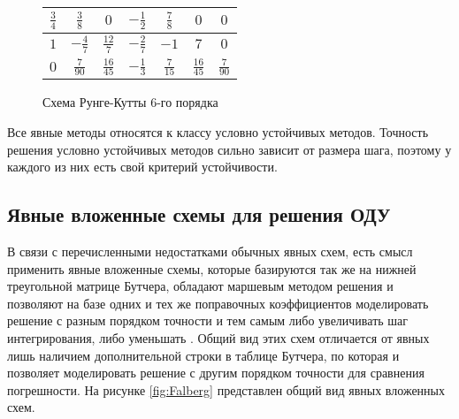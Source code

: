 \begin{figure}
\begin{minipage}[t]{7.5cm}
\begin{table}
\begin{tabular}{|c|c|c|c|c|c|c|}
            $\frac{3}{4}$ & $\frac{3}{8}$ & $0$ & $-\frac{1}{2}$ & $\frac{7}{8}$ & $0$ & $0$\\
            \hline
            $1$ & $-\frac{4}{7}$ & $\frac{12}{7}$ & $-\frac{2}{7}$ & $-1$ & $7$ & $0$\\
            \hline
            $0$ & \cellcolor{lightgray} $\frac{7}{90}$ & \cellcolor{lightgray} $\frac{16}{45}$ & \cellcolor{lightgray} $-\frac{1}{3}$ & \cellcolor{lightgray} $\frac{7}{15}$ & \cellcolor{lightgray} $\frac{16}{45}$ & \cellcolor{lightgray} $\frac{7}{90}$\\
            \hline
            \end{tabular}
        \end{table}
    \end{minipage}
    \caption{Схема Рунге-Кутты 6-го порядка}
    \label{fig:RungeKutta6}
\end{figure}

Все явные методы относятся к классу условно устойчивых методов. Точность решения условно устойчивых методов сильно зависит от размера шага,
поэтому у каждого из них есть свой критерий устойчивости.

\subsection{Явные вложенные схемы для решения ОДУ}

В связи с перечисленными недостатками обычных явных схем, есть смысл применить явные вложенные схемы, которые базируются так же на
нижней треугольной матрице Бутчера, обладают маршевым
методом решения и позволяют на базе одних и тех же поправочных коэффициентов моделировать решение с разным порядком точности и тем
самым либо увеличивать шаг интегрирования, либо уменьшать \cite{Article7, cite_1_3}. Общий вид этих схем отличается от явных лишь наличием дополнительной строки
в таблице Бутчера, по которая и позволяет моделировать решение с другим порядком точности для сравнения погрешности. На рисунке
\ref{fig:Falberg} представлен общий вид явных вложенных схем.

